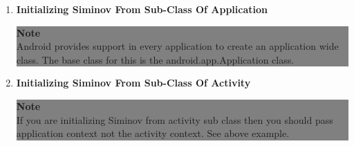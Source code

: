 \begin{enumerate}

	\item \small \textbf{Initializing Siminov From Sub-Class Of Application}

		
	
		\begin{center}
			\colorbox{grey}{
				\parbox[t]{.8\linewidth}{
					\fontsize{11pt}{11pt}\selectfont %
					\vspace*{0.1cm} %
		
					\hfill \textbf{Note} \\

					Android provides support in every application to create an application wide class. The base class for this is the android.app.Application class. 

					\vspace*{0.0cm} %
				}
			}

		\end{center}

	\newpage
	\item \small \textbf{Initializing Siminov From Sub-Class Of Activity}

		


		\begin{center}
			\colorbox{grey}{
				\parbox[t]{.8\linewidth}{
					\fontsize{11pt}{11pt}\selectfont %
					\vspace*{0.1cm} %
		
					\hfill \textbf{Note} \\

					If you are initializing Siminov from activity sub class then you should pass application context not the activity context. See above example.

					\vspace*{0.0cm} %
				}
			}

		\end{center}


\end{enumerate}



